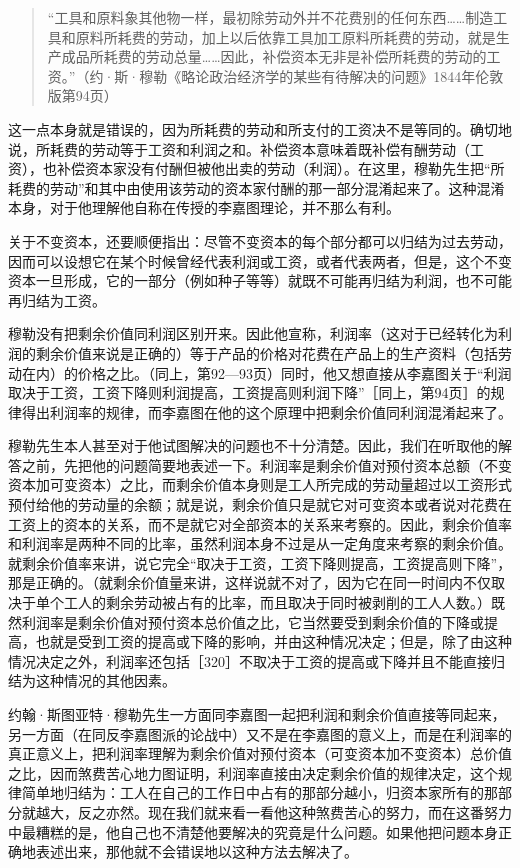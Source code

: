 \begin{quote}{“工具和原料象其他物一样，最初除劳动外并不花费别的任何东西……制造工具和原料所耗费的劳动，加上以后依靠工具加工原料所耗费的劳动，就是生产成品所耗费的劳动总量……因此，补偿资本无非是补偿所耗费的劳动的工资。”（约·斯·穆勒《略论政治经济学的某些有待解决的问题》1844年伦敦版第94页）}\end{quote}

这一点本身就是错误的，因为所耗费的劳动和所支付的工资决不是等同的。确切地说，所耗费的劳动等于工资和利润之和。补偿资本意味着既补偿有酬劳动（工资），也补偿资本家没有付酬但被他出卖的劳动（利润）。在这里，穆勒先生把“所耗费的劳动”和其中由使用该劳动的资本家付酬的那一部分混淆起来了。这种混淆本身，对于他理解他自称在传授的李嘉图理论，并不那么有利。

关于不变资本，还要顺便指出：尽管不变资本的每个部分都可以归结为过去劳动，因而可以设想它在某个时候曾经代表利润或工资，或者代表两者，但是，这个不变资本一旦形成，它的一部分（例如种子等等）就既不可能再归结为利润，也不可能再归结为工资。

穆勒没有把剩余价值同利润区别开来。因此他宣称，利润率（这对于已经转化为利润的剩余价值来说是正确的）等于产品的价格对花费在产品上的生产资料（包括劳动在内）的价格之比。（同上，第92—93页）同时，他又想直接从李嘉图关于“利润取决于工资，工资下降则利润提高，工资提高则利润下降”［同上，第94页］的规律得出利润率的规律，而李嘉图在他的这个原理中把剩余价值同利润混淆起来了。

穆勒先生本人甚至对于他试图解决的问题也不十分清楚。因此，我们在听取他的解答之前，先把他的问题简要地表述一下。利润率是剩余价值对预付资本总额（不变资本加可变资本）之比，而剩余价值本身则是工人所完成的劳动量超过以工资形式预付给他的劳动量的余额；就是说，剩余价值只是就它对可变资本或者说对花费在工资上的资本的关系，而不是就它对全部资本的关系来考察的。因此，剩余价值率和利润率是两种不同的比率，虽然利润本身不过是从一定角度来考察的剩余价值。就剩余价值率来讲，说它完全“取决于工资，工资下降则提高，工资提高则下降”，那是正确的。（就剩余价值量来讲，这样说就不对了，因为它在同一时间内不仅取决于单个工人的剩余劳动被占有的比率，而且取决于同时被剥削的工人人数。）既然利润率是剩余价值对预付资本总价值之比，它当然要受到剩余价值的下降或提高，也就是受到工资的提高或下降的影响，并由这种情况决定；但是，除了由这种情况决定之外，利润率还包括［320］不取决于工资的提高或下降并且不能直接归结为这种情况的其他因素。

约翰·斯图亚特·穆勒先生一方面同李嘉图一起把利润和剩余价值直接等同起来，另一方面（在同反李嘉图派的论战中）又不是在李嘉图的意义上，而是在利润率的真正意义上，把利润率理解为剩余价值对预付资本（可变资本加不变资本）总价值之比，因而煞费苦心地力图证明，利润率直接由决定剩余价值的规律决定，这个规律简单地归结为：工人在自己的工作日中占有的那部分越小，归资本家所有的那部分就越大，反之亦然。现在我们就来看一看他这种煞费苦心的努力，而在这番努力中最糟糕的是，他自己也不清楚他要解决的究竟是什么问题。如果他把问题本身正确地表述出来，那他就不会错误地以这种方法去解决了。


